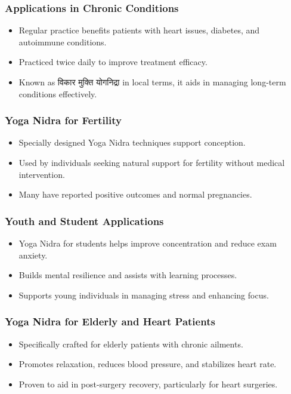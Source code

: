 \begin{frame}[fragile]\frametitle{Applications in Chronic Conditions}
    \begin{itemize}
        \item Regular practice benefits patients with heart issues, diabetes, and autoimmune conditions.
        \item Practiced twice daily to improve treatment efficacy.
        \item Known as विकार मुक्ति योगनिद्रा in local terms, it aids in managing long-term conditions effectively.
    \end{itemize}
\end{frame}

\begin{frame}[fragile]\frametitle{Yoga Nidra for Fertility}
    \begin{itemize}
        \item Specially designed Yoga Nidra techniques support conception.
        \item Used by individuals seeking natural support for fertility without medical intervention.
        \item Many have reported positive outcomes and normal pregnancies.
    \end{itemize}
\end{frame}

\begin{frame}[fragile]\frametitle{Youth and Student Applications}
    \begin{itemize}
        \item Yoga Nidra for students helps improve concentration and reduce exam anxiety.
        \item Builds mental resilience and assists with learning processes.
        \item Supports young individuals in managing stress and enhancing focus.
    \end{itemize}
\end{frame}

\begin{frame}[fragile]\frametitle{Yoga Nidra for Elderly and Heart Patients}
    \begin{itemize}
        \item Specifically crafted for elderly patients with chronic ailments.
        \item Promotes relaxation, reduces blood pressure, and stabilizes heart rate.
        \item Proven to aid in post-surgery recovery, particularly for heart surgeries.
    \end{itemize}
\end{frame}

